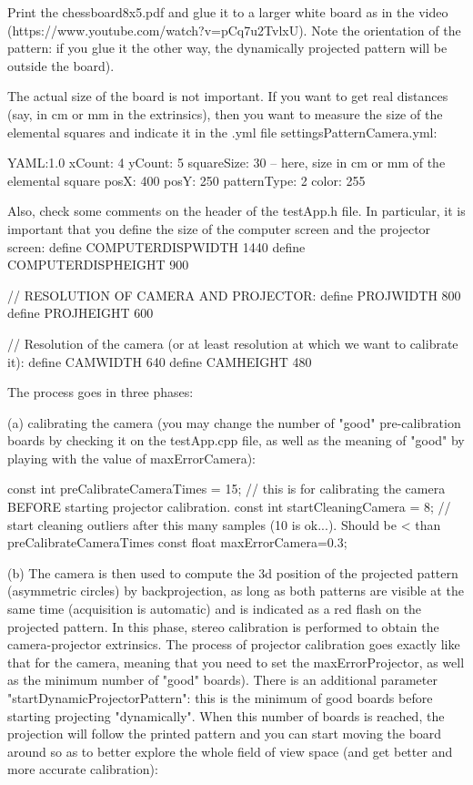 Print the chessboard8x5.pdf and glue it to a larger white board as in the video (https://www.youtube.com/watch?v=pCq7u2TvlxU). Note the orientation of the pattern: if you glue it the other way, the dynamically projected pattern will be outside the board).

The actual size of the board is not important. If you want to get real distances (say, in cm or mm in the extrinsics), then you want to measure the size of the elemental squares and indicate it in the .yml file settingsPatternCamera.yml:

YAML:1.0 xCount: 4 yCount: 5 squareSize: 30 -- here, size in cm or mm of the elemental square posX: 400 posY: 250 patternType: 2 color: 255

Also, check some comments on the header of the testApp.h file. In particular, it is important that you define the size of the computer screen and the projector screen:
define COMPUTERDISPWIDTH 1440
define COMPUTERDISPHEIGHT 900

// RESOLUTION OF CAMERA AND PROJECTOR:
define PROJWIDTH 800
define PROJHEIGHT 600

// Resolution of the camera (or at least resolution at which we want to calibrate it):
define CAMWIDTH 640
define CAMHEIGHT 480

The process goes in three phases:

(a) calibrating the camera (you may change the number of "good" pre-calibration boards by checking it on the testApp.cpp file, as well as the meaning of "good" by playing with the value of maxErrorCamera):

const int preCalibrateCameraTimes = 15; // this is for calibrating the camera BEFORE starting projector calibration. const int startCleaningCamera = 8; // start cleaning outliers after this many samples (10 is ok...). Should be < than preCalibrateCameraTimes const float maxErrorCamera=0.3;

(b) The camera is then used to compute the 3d position of the projected pattern (asymmetric circles) by backprojection, as long as both patterns are visible at the same time (acquisition is automatic) and is indicated as a red flash on the projected pattern. In this phase, stereo calibration is performed to obtain the camera-projector extrinsics. The process of projector calibration goes exactly like that for the camera, meaning that you need to set the maxErrorProjector, as well as the minimum number of "good" boards). There is an additional parameter "startDynamicProjectorPattern": this is the minimum of good boards before starting projecting "dynamically". When this number of boards is reached, the projection will follow the printed pattern and you can start moving the board around so as to better explore the whole field of view space (and get better and more accurate calibration):

